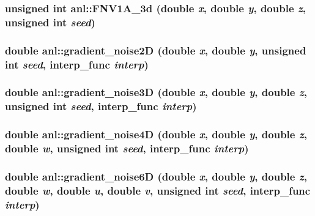 \label{namespaceanl_a6dff2151ef31b675e2f7571fec43457f}
\hypertarget{namespaceanl_abd12e744f21b4679a551c6a08de278cb}{
\subsubsection[{FNV1A\_\-3d}]{\setlength{\rightskip}{0pt plus 5cm}unsigned int anl::FNV1A\_\-3d (double {\em x}, \/  double {\em y}, \/  double {\em z}, \/  unsigned int {\em seed})}}
\label{namespaceanl_abd12e744f21b4679a551c6a08de278cb}
\hypertarget{namespaceanl_a8fd5529d1a730cad3558b0f65e94de8d}{
\subsubsection[{gradient\_\-noise2D}]{\setlength{\rightskip}{0pt plus 5cm}double anl::gradient\_\-noise2D (double {\em x}, \/  double {\em y}, \/  unsigned int {\em seed}, \/  interp\_\-func {\em interp})}}
\label{namespaceanl_a8fd5529d1a730cad3558b0f65e94de8d}
\hypertarget{namespaceanl_a066bdeb1dd668118063b9b22218a0513}{
\subsubsection[{gradient\_\-noise3D}]{\setlength{\rightskip}{0pt plus 5cm}double anl::gradient\_\-noise3D (double {\em x}, \/  double {\em y}, \/  double {\em z}, \/  unsigned int {\em seed}, \/  interp\_\-func {\em interp})}}
\label{namespaceanl_a066bdeb1dd668118063b9b22218a0513}
\hypertarget{namespaceanl_a3db30890d9320d87f40afe3be85dfcf7}{
\subsubsection[{gradient\_\-noise4D}]{\setlength{\rightskip}{0pt plus 5cm}double anl::gradient\_\-noise4D (double {\em x}, \/  double {\em y}, \/  double {\em z}, \/  double {\em w}, \/  unsigned int {\em seed}, \/  interp\_\-func {\em interp})}}
\label{namespaceanl_a3db30890d9320d87f40afe3be85dfcf7}
\hypertarget{namespaceanl_ac98904b69077be4f5b3719ec1f564019}{
\subsubsection[{gradient\_\-noise6D}]{\setlength{\rightskip}{0pt plus 5cm}double anl::gradient\_\-noise6D (double {\em x}, \/  double {\em y}, \/  double {\em z}, \/  double {\em w}, \/  double {\em u}, \/  double {\em v}, \/  unsigned int {\em seed}, \/  interp\_\-func {\em interp})}}
